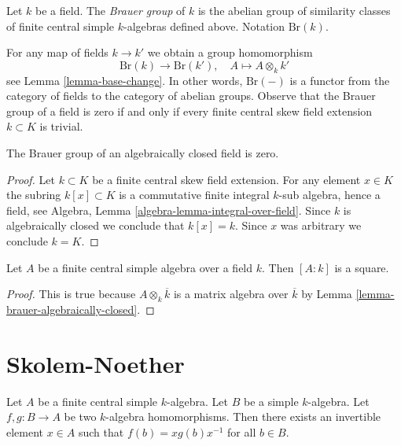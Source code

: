 \begin{definition}
\label{definition-brauer-group}
Let $k$ be a field. The {\it Brauer group} of $k$ is the abelian group
of similarity classes of finite central simple $k$-algebras defined
above. Notation $\text{Br}(k)$.
\end{definition}

\noindent
For any map of fields $k \to k'$ we obtain a group homomorphism
$$
\text{Br}(k) \longrightarrow \text{Br}(k'),\quad
A \longmapsto A \otimes_k k'
$$
see Lemma \ref{lemma-base-change}. In other words, $\text{Br}(-)$ is
a functor from the category of fields to the category of abelian groups.
Observe that the Brauer group
of a field is zero if and only if every finite central skew field
extension $k \subset K$ is trivial.

\begin{lemma}
\label{lemma-brauer-algebraically-closed}
The Brauer group of an algebraically closed field is zero.
\end{lemma}

\begin{proof}
Let $k \subset K$ be a finite central skew field extension.
For any element $x \in K$ the subring $k[x] \subset K$ is a
commutative finite integral $k$-sub algebra, hence a field, see
Algebra, Lemma \ref{algebra-lemma-integral-over-field}.
Since $k$ is algebraically closed we conclude that
$k[x] = k$. Since $x$ was arbitrary we conclude $k = K$.
\end{proof}

\begin{lemma}
\label{lemma-dimension-square}
Let $A$ be a finite central simple algebra over a field $k$.
Then $[A : k]$ is a square.
\end{lemma}

\begin{proof}
This is true because $A \otimes_k \overline{k}$ is a matrix
algebra over $\overline{k}$ by
Lemma \ref{lemma-brauer-algebraically-closed}.
\end{proof}




\section{Skolem-Noether}
\label{section-skolem-noether}



\begin{theorem}
\label{theorem-skolem-noether}
Let $A$ be a finite central simple $k$-algebra. Let $B$ be a simple
$k$-algebra. Let $f, g : B \to A$ be two $k$-algebra homomorphisms.
Then there exists an invertible element $x \in A$ such that
$f(b) = xg(b)x^{-1}$ for all $b \in B$.
\end{theorem}

